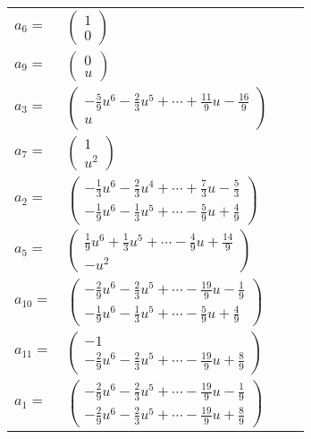 \documentclass[1p]{elsarticle_modified}
\theoremstyle{definition}
\begin{document}
\begin{tabular}{m{7pt} m{180pt} m{7pt} m{180pt} }
\flushright $a_{6}=$&$\begin{pmatrix}1\\0\end{pmatrix}$ \\
\flushright $a_{9}=$&$\begin{pmatrix}0\\u\end{pmatrix}$ \\
\flushright $a_{3}=$&$\begin{pmatrix}-\frac{5}{9} u^6-\frac{2}{3} u^5+\cdots+\frac{11}{9} u-\frac{16}{9}\\u\end{pmatrix}$ \\
\flushright $a_{7}=$&$\begin{pmatrix}1\\u^2\end{pmatrix}$ \\
\flushright $a_{2}=$&$\begin{pmatrix}-\frac{1}{3} u^6-\frac{2}{3} u^4+\cdots+\frac{7}{3} u-\frac{5}{3}\\-\frac{1}{9} u^6-\frac{1}{3} u^5+\cdots-\frac{5}{9} u+\frac{4}{9}\end{pmatrix}$ \\
\flushright $a_{5}=$&$\begin{pmatrix}\frac{1}{9} u^6+\frac{1}{3} u^5+\cdots-\frac{4}{9} u+\frac{14}{9}\\- u^2\end{pmatrix}$ \\
\flushright $a_{10}=$&$\begin{pmatrix}-\frac{2}{9} u^6-\frac{2}{3} u^5+\cdots-\frac{19}{9} u-\frac{1}{9}\\-\frac{1}{9} u^6-\frac{1}{3} u^5+\cdots-\frac{5}{9} u+\frac{4}{9}\end{pmatrix}$ \\
\flushright $a_{11}=$&$\begin{pmatrix}-1\\-\frac{2}{9} u^6-\frac{2}{3} u^5+\cdots-\frac{19}{9} u+\frac{8}{9}\end{pmatrix}$ \\
\flushright $a_{1}=$&$\begin{pmatrix}-\frac{2}{9} u^6-\frac{2}{3} u^5+\cdots-\frac{19}{9} u-\frac{1}{9}\\-\frac{2}{9} u^6-\frac{2}{3} u^5+\cdots-\frac{19}{9} u+\frac{8}{9}\end{pmatrix}$ \\

\end{tabular}
\end{document}

